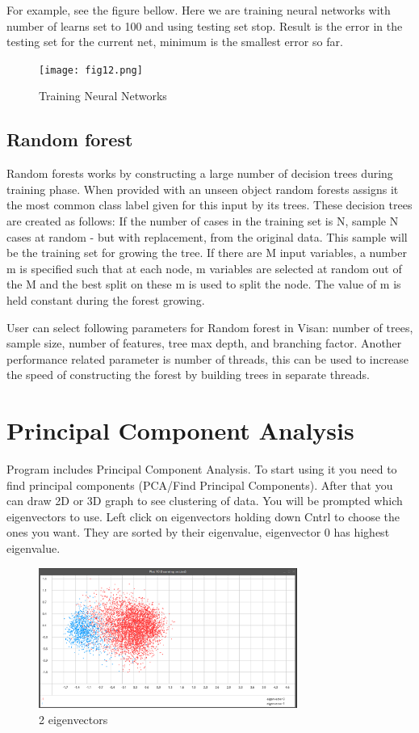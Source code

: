 \documentclass[a4paper,12pt,english]{report}
\begin{document}
For example, see the figure bellow. Here we are training neural networks with number of learns set to 100 and using testing set stop. Result is the error in the testing set for the current net, minimum is the smallest error so far. 
\begin{figure}[htb]
\centering
\texttt{[image: fig12.png]}
\caption{Training Neural Networks}
\end{figure}

\newpage
\subsection*{Random forest}
Random forests works by constructing a large number of decision trees during training phase. When provided with an unseen object random forests assigns 
it the most common class label given for this input by its trees. These decision  trees are created as follows:
If the number of cases in the training set is N, sample N cases at random - but with replacement, from the original data. This sample will be the training set for growing the tree. If there are M input variables, a number m is specified such that at each node, m variables are selected at random out of the M and the best split on these m is used to split the node. The value of m is held constant during the forest growing. 

User can select following parameters for Random forest in Visan: number of trees, sample size, number of features, tree max depth, and branching factor. Another performance related parameter is number of threads, this can be used to increase the speed of constructing the forest by building trees in separate threads. 


\newpage

\section*{Principal Component Analysis}
Program includes Principal Component Analysis. To start using it you need to find principal components (PCA/Find Principal Components). After that you can draw 2D or 3D graph to see clustering of data. You will be prompted which eigenvectors to use. Left click on eigenvectors holding down Cntrl to choose the ones you want. They are sorted by their eigenvalue, eigenvector 0 has highest eigenvalue.

\begin{figure}[htb]
\centering
\includegraphics[width=240pt]{fig13.png}
\caption{2 eigenvectors}
\end{figure}
\end{document}
